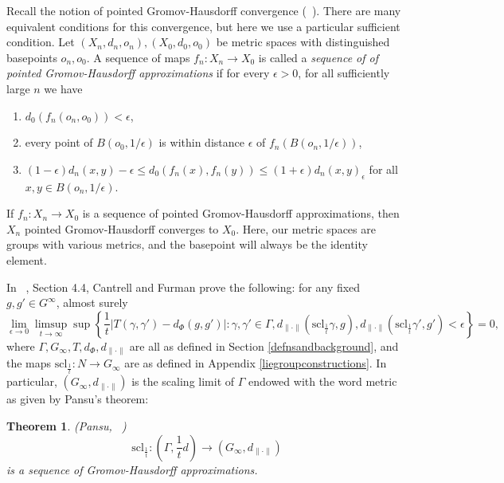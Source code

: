 \documentclass[12pt,reqno]{article}
\numberwithin{equation}{section}
\newcommand{\scl}{\mathrm{scl}}
\newtheorem{thm}{Theorem}
\begin{document}
Recall the notion of pointed Gromov-Hausdorff convergence (~\cite{GromovMetric}). There are many equivalent conditions for this convergence,
but here we use a particular sufficient condition. Let $(X_n,d_n, o_n), (X_0,d_0, o_0)$ be metric spaces with distinguished basepoints
 $o_n, o_0$.
 A sequence of maps $f_n: X_n \to X_0$
 is called a \emph{sequence of of pointed Gromov-Hausdorff approximations} if for every $\epsilon > 0$, for all sufficiently large $n$
 we have
 \begin{enumerate}
 \item $d_0(f_n(o_n,o_0)) < \epsilon$,
 \item every point of $B(o_0, 1/\epsilon)$ is within distance $\epsilon$ of $f_n(B(o_n, 1/\epsilon))$,
 \item $(1-\epsilon)d_n(x,y) - \epsilon \le d_0(f_n(x),f_n(y)) \le (1+\epsilon)d_n(x,y) _ \epsilon$ for all $x,y \in B(o_n, 1/\epsilon)$.
 \end{enumerate}
 If $f_n:X_n \to X_0$ is a sequence of pointed Gromov-Hausdorff approximations, then $X_n$ pointed Gromov-Hausdorff converges to $X_0$.
Here, our metric spaces are groups with various metrics, and the basepoint will always be the identity element.

In ~\cite{CantrellFurman}, Section 4.4, Cantrell and Furman prove the following: for any fixed $g, g' \in G^{\infty}$, almost surely
\begin{equation}
   \lim_{\epsilon \to 0} \limsup_{t \to \infty} \sup \left\{ \frac{1}{t} |T(\gamma, \gamma') - d_{\Phi}(g,g')| : 
   \gamma,\gamma' \in \Gamma, d_{\|\cdot\|}(\scl_{\frac{1}{t}} \gamma, g), d_{\|\cdot\|}(\scl_{\frac{1}{t}} \gamma', g') < \epsilon \right\} = 0,
   \label{eq:ptwise}
\end{equation}
where $\Gamma, G_{\infty}, T, d_{\Phi}, d_{\| \cdot \|}$ are all as defined in Section \ref{defnsandbackground},
and the maps $\scl_{\frac{1}{t}} : N \to G_{\infty}$ are as defined in Appendix \ref{liegroupconstructions}.
In particular,
$(G_{\infty},d_{\| \cdot \|})$ is the scaling limit of $\Gamma$ endowed with the word metric as given by Pansu's theorem:
\begin{thm}{(Pansu, ~\cite{Pansu})} \label{pansuthm}
   \[ \scl_{\frac{1}{t}} : (\Gamma, \frac{1}{t} d) \to (G_{\infty}, d_{\| \cdot \|}) \]
   is a sequence of Gromov-Hausdorff approximations.
\end{thm}
\end{document}
